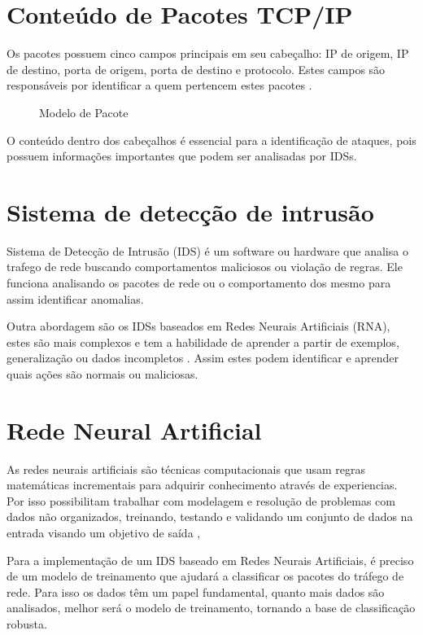 \section{Conteúdo de Pacotes TCP/IP}
Os pacotes possuem cinco campos principais em seu cabeçalho: IP de origem, IP de destino, porta de origem, porta de destino e protocolo. Estes campos são responsáveis por identificar a quem pertencem estes pacotes \cite{sbrc_estendido}.

\begin{figure}[h]
\renewcommand\thefigure{1}
\centering
\caption{Modelo de Pacote}
\label{fig:exemplo}
\end{figure}

O conteúdo dentro dos cabeçalhos é essencial para a identificação de ataques, pois possuem informações importantes que podem ser analisadas por IDSs.

\section{Sistema de detecção de intrusão}
Sistema de Detecção de Intrusão (IDS) é um software ou hardware que analisa o trafego de rede buscando comportamentos maliciosos ou violação de regras. Ele funciona analisando os pacotes de rede ou o comportamento dos mesmo para assim identificar anomalias. \cite{CHORAS2021705}

Outra abordagem são os IDSs baseados em Redes Neurais Artificiais (RNA), estes são mais complexos e tem a habilidade de aprender a partir de exemplos, generalização ou dados incompletos \cite{Anitha}. Assim estes podem identificar e aprender quais ações são normais ou maliciosas.

\section{Rede Neural Artificial}
As redes neurais artificiais são técnicas computacionais que usam regras matemáticas incrementais para adquirir conhecimento através de experiencias. Por isso possibilitam trabalhar com modelagem e resolução de
problemas com dados não organizados, treinando, testando e validando um conjunto de dados na entrada visando um objetivo de saída \cite{barros2018avaliaccao},

Para a implementação de um IDS baseado em Redes Neurais Artificiais, é preciso de um modelo de treinamento que ajudará a classificar os pacotes do tráfego de rede. Para isso os dados têm um papel fundamental, quanto mais dados são analisados, melhor será o modelo de treinamento, tornando a base de classificação robusta.